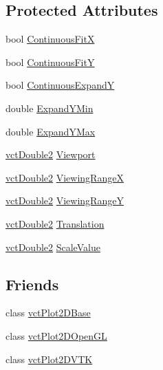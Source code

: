 \subsection*{Protected Attributes}
\begin{DoxyCompactItemize}
\item 
bool \hyperlink{classvct_plot2_d_base_1_1_scale_af427cb10aa8954351e39f21ad9b03b31}{Continuous\+Fit\+X}
\item 
bool \hyperlink{classvct_plot2_d_base_1_1_scale_a2458a3a97a0362e8abbb253bffaf1e02}{Continuous\+Fit\+Y}
\item 
bool \hyperlink{classvct_plot2_d_base_1_1_scale_a46c3d6f50988f6f4e9ca584b2162b79a}{Continuous\+Expand\+Y}
\item 
double \hyperlink{classvct_plot2_d_base_1_1_scale_a8c14c31f9f79bddb29f2e5708712e3ab}{Expand\+Y\+Min}
\item 
double \hyperlink{classvct_plot2_d_base_1_1_scale_a21b8fd5b223a8aacf1f0dffe9858c286}{Expand\+Y\+Max}
\item 
\hyperlink{vct_fixed_size_vector_types_8h_afc0fdcc41cbe8b043747612501610812}{vct\+Double2} \hyperlink{classvct_plot2_d_base_1_1_scale_a3ad0dc662565feaa26046ab15b40efb1}{Viewport}
\item 
\hyperlink{vct_fixed_size_vector_types_8h_afc0fdcc41cbe8b043747612501610812}{vct\+Double2} \hyperlink{classvct_plot2_d_base_1_1_scale_a9d017bf27e0f5cef7a916acb0c5b9638}{Viewing\+Range\+X}
\item 
\hyperlink{vct_fixed_size_vector_types_8h_afc0fdcc41cbe8b043747612501610812}{vct\+Double2} \hyperlink{classvct_plot2_d_base_1_1_scale_accd0d96ac002b90cabd39bcd3bcc4ee4}{Viewing\+Range\+Y}
\item 
\hyperlink{vct_fixed_size_vector_types_8h_afc0fdcc41cbe8b043747612501610812}{vct\+Double2} \hyperlink{classvct_plot2_d_base_1_1_scale_a3155819b99d706351348e96ab827665c}{Translation}
\item 
\hyperlink{vct_fixed_size_vector_types_8h_afc0fdcc41cbe8b043747612501610812}{vct\+Double2} \hyperlink{classvct_plot2_d_base_1_1_scale_ad947e7d58e45f838430c34d70c0ec401}{Scale\+Value}
\end{DoxyCompactItemize}
\subsection*{Friends}
\begin{DoxyCompactItemize}
\item 
class \hyperlink{classvct_plot2_d_base_1_1_scale_ab1e5a371f284a693f5624104a92ac684}{vct\+Plot2\+D\+Base}
\item 
class \hyperlink{classvct_plot2_d_base_1_1_scale_a2a04e9e21d2a68342a48b433ff25b7f7}{vct\+Plot2\+D\+Open\+G\+L}
\item 
class \hyperlink{classvct_plot2_d_base_1_1_scale_a61e8f9a436596e1195d2b34b7b5c6f2e}{vct\+Plot2\+D\+V\+T\+K}
\end{DoxyCompactItemize}


